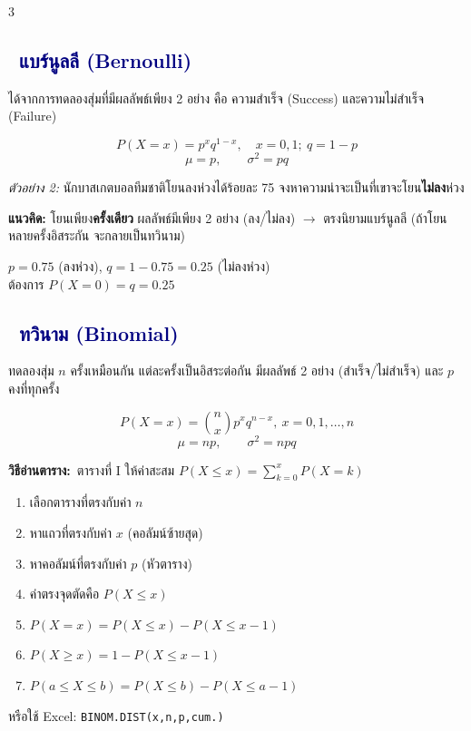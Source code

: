 \documentclass[9pt]{extarticle}
\newcommand{\dist}[1]{\subsection*{\textcolor{navy}{\textbullet\ #1}}}
\newcommand{\howto}{\textbf{\textcolor{navy!70!black}{วิธีอ่านตาราง:}}\ }
\begin{document}
\begin{multicols}{3}
\begin{center}
\end{center}

\dist{แบร์นูลลี (Bernoulli)}
ได้จากการทดลองสุ่มที่มีผลลัพธ์เพียง 2 อย่าง คือ ความสำเร็จ (Success) และความไม่สำเร็จ (Failure)
\begin{formulabox}
$$P(X{=}x)=p^x q^{1-x},\quad x=0,1;\ q=1-p$$
$$\mu = p, \qquad \sigma^2 = pq$$
\end{formulabox}

\textit{ตัวอย่าง 2:} นักบาสเกตบอล\allowbreak ทีมชาติ\allowbreak โยนลงห่วง\allowbreak ได้ร้อยละ 75 จงหา\allowbreak ความน่าจะเป็น\allowbreak ที่เขาจะโยน\textbf{ไม่ลง}ห่วง
\begin{ideabox}
\textbf{แนวคิด:} โยน\allowbreak เพียง\textbf{ครั้งเดียว} ผลลัพธ์มี\allowbreak เพียง 2 อย่าง (ลง/ไม่ลง) $\to$ ตรงนิยาม\allowbreak แบร์นูลลี (ถ้าโยน\allowbreak หลายครั้ง\allowbreak อิสระกัน จะกลาย\allowbreak เป็นทวินาม)
\end{ideabox}
\begin{solbox}
$p=0.75$ (ลงห่วง), $q=1-0.75=0.25$ (ไม่ลงห่วง)\\
ต้องการ $P(X{=}0)=q=0.25$
\end{solbox}

\begin{center}
\end{center}

\dist{ทวินาม (Binomial)}
ทดลองสุ่ม $n$ ครั้งเหมือนกัน แต่ละครั้งเป็นอิสระต่อกัน มีผลลัพธ์ 2 อย่าง (สำเร็จ/ไม่สำเร็จ) และ $p$ คงที่ทุกครั้ง
\begin{formulabox}
$$P(X{=}x)=\binom{n}{x}p^x q^{n-x},\ x=0,1,\dots,n$$
$$\mu = np, \qquad \sigma^2 = npq$$
\end{formulabox}

\howto ตารางที่ I ให้ค่าสะสม $P(X\le x)=\sum_{k=0}^{x}P(X{=}k)$
\begin{enumerate}
\item เลือกตารางที่ตรงกับค่า $n$
\item หาแถวที่ตรงกับค่า $x$ (คอลัมน์ซ้ายสุด)
\item หาคอลัมน์ที่ตรงกับค่า $p$ (หัวตาราง)
\item ค่าตรงจุดตัดคือ $P(X\le x)$
\item $P(X{=}x)=P(X\le x)-P(X\le x{-}1)$
\item $P(X\ge x)=1-P(X\le x{-}1)$
\item $P(a\le X\le b)=P(X\le b)-P(X\le a{-}1)$
\end{enumerate}
หรือใช้ Excel: \texttt{BINOM.DIST}\allowbreak\texttt{(x,n,p,cum.)}


\end{multicols}
\end{document}
